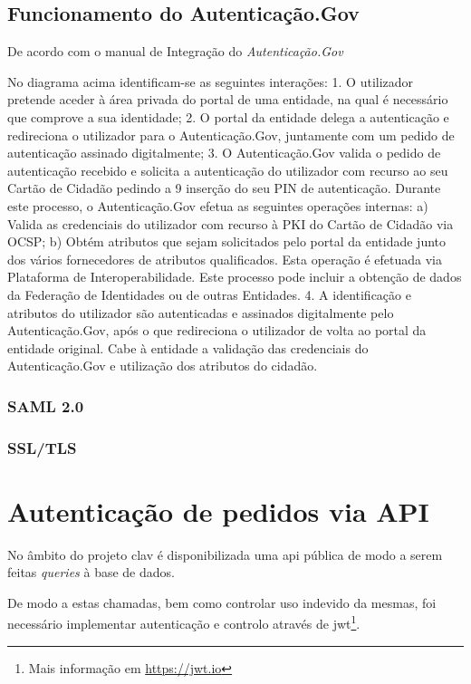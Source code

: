 \subsection{Funcionamento do Autenticação.Gov}

De acordo com o manual de Integração do \emph{Autenticação.Gov}\cite{manualAuthGov}

No diagrama acima identificam-se as seguintes interações:
1. O utilizador pretende aceder à área privada do portal de uma entidade, na qual é necessário que comprove a sua identidade;
2. O portal da entidade delega a autenticação e redireciona o utilizador para o Autenticação.Gov, juntamente com um pedido de autenticação assinado digitalmente;
3. O Autenticação.Gov valida o pedido de autenticação recebido e solicita a autenticação do utilizador com recurso ao seu Cartão de Cidadão pedindo a
 9
 inserção do seu PIN de autenticação. Durante este processo, o Autenticação.Gov efetua as seguintes operações internas:
a) Valida as credenciais do utilizador com recurso à PKI do Cartão de Cidadão via OCSP;
b) Obtém atributos que sejam solicitados pelo portal da entidade junto dos vários fornecedores de atributos qualificados. Esta operação é efetuada via Plataforma de Interoperabilidade. Este processo pode incluir a obtenção de dados da Federação de Identidades ou de outras Entidades.
4. A identificação e atributos do utilizador são autenticadas e assinados digitalmente pelo Autenticação.Gov, após o que redireciona o utilizador de volta ao portal da entidade original. Cabe à entidade a validação das credenciais do Autenticação.Gov e utilização dos atributos do cidadão.

\subsubsection{SAML 2.0}
\subsubsection{SSL/TLS}

\cleardoublepage
\section{Autenticação de pedidos via API}

No âmbito do projeto \gls{clav} é disponibilizada uma \gls{api} pública de modo a serem feitas \emph{queries} à base de dados.

De modo a estas chamadas, bem como controlar uso indevido da mesmas, foi necessário implementar autenticação e controlo através de \gls{jwt}\footnote{Mais informação em \url{https://jwt.io}}.

